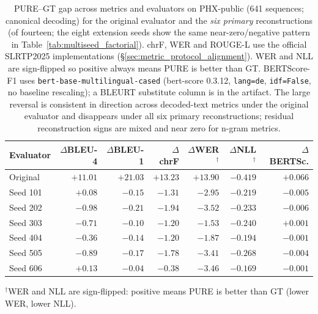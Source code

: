 \documentclass[pdflatex,sn-chicago]{sn-jnl}
\begin{document}
\begin{table}[t]
\centering
\scriptsize\setlength{\tabcolsep}{3pt}
\caption{PURE--GT gap across metrics and evaluators on PHX-public (641 sequences; canonical decoding) for the original evaluator and the \emph{six primary} reconstructions (of fourteen; the eight extension seeds show the same near-zero/negative pattern in Table~\ref{tab:multiseed_factorial}). chrF, WER and ROUGE-L use the official SLRTP2025 implementations (\S\ref{sec:metric_protocol_alignment}). WER and NLL are sign-flipped so positive always means PURE is better than GT. BERTScore-F1 uses \texttt{bert-base-multilingual-cased} (bert-score 0.3.12, \texttt{lang=de}, \texttt{idf=False}, no baseline rescaling); a BLEURT substitute column is in the artifact. The large reversal is consistent in direction across decoded-text metrics under the original evaluator and disappears under all six primary reconstructions; residual reconstruction signs are mixed and near zero for n-gram metrics.}
\label{tab:cross_metric_gap}
\begin{tabular}{lrrrrrr}
\toprule
Evaluator & $\Delta$BLEU-4 & $\Delta$BLEU-1 & $\Delta$chrF & $\Delta$WER$^\dagger$ & $\Delta$NLL$^\dagger$ & $\Delta$BERTSc. \\
\midrule
Original & $+11.01$ & $+21.03$ & $+13.23$ & $+13.90$ & $-0.419$ & $+0.066$ \\
Seed 101 & $+0.08$ & $-0.15$ & $-1.31$ & $-2.95$ & $-0.219$ & $-0.005$ \\
Seed 202 & $-0.98$ & $-0.21$ & $-1.94$ & $-3.52$ & $-0.233$ & $-0.006$ \\
Seed 303 & $-0.71$ & $-0.10$ & $-1.20$ & $-1.53$ & $-0.240$ & $+0.001$ \\
Seed 404 & $-0.36$ & $-0.14$ & $-1.20$ & $-1.87$ & $-0.194$ & $-0.001$ \\
Seed 505 & $-0.89$ & $-0.17$ & $-1.78$ & $-3.41$ & $-0.268$ & $-0.004$ \\
Seed 606 & $+0.13$ & $-0.04$ & $-0.38$ & $-3.46$ & $-0.169$ & $-0.001$ \\
\bottomrule
\end{tabular}
\par\smallskip
\footnotesize $^\dagger$WER and NLL are sign-flipped: positive means PURE is better than GT (lower WER, lower NLL).
\end{table}
\end{document}
